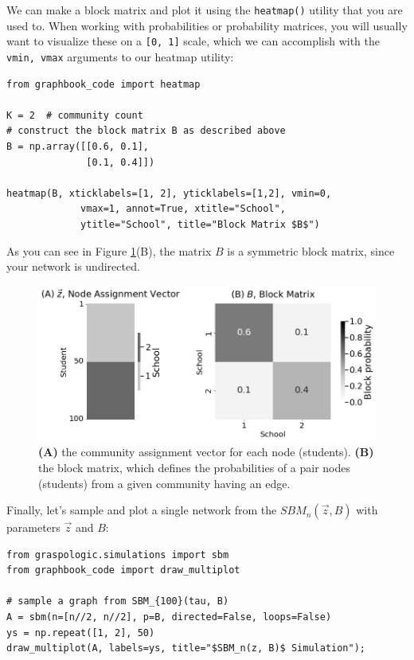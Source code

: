 We can make a block matrix and plot it using the \texttt{heatmap()} utility that you are used to. When working with probabilities or probability matrices, you will usually want to visualize these on a \texttt{[0, 1]} scale, which we can accomplish with the \texttt{vmin, vmax} arguments to our heatmap utility:

\begin{lstlisting}[style=python]
from graphbook_code import heatmap

K = 2  # community count
# construct the block matrix B as described above
B = np.array([[0.6, 0.1], 
              [0.1, 0.4]])

heatmap(B, xticklabels=[1, 2], yticklabels=[1,2], vmin=0, 
             vmax=1, annot=True, xtitle="School",
             ytitle="School", title="Block Matrix $B$")
\end{lstlisting}

As you can see in Figure \ref{fig:ch5:sbm}(B), the matrix $B$ is a symmetric block matrix, since your network is undirected. 

\begin{figure}
    \centering
    \includegraphics[width=\linewidth]{representations/ch5/Images/sbm.png}
    \caption[Parameters for a stochastic block model]{\textbf{(A)} the community assignment vector for each node (students). \textbf{(B)} the block matrix, which defines the probabilities of a pair nodes (students) from a given community having an edge.}
    \label{fig:ch5:sbm}
\end{figure}

Finally, let's sample and plot a single network from the $SBM_n(\vec z, B)$ with parameters $\vec z$ and $B$:

\begin{lstlisting}[style=python]
from graspologic.simulations import sbm
from graphbook_code import draw_multiplot

# sample a graph from SBM_{100}(tau, B)
A = sbm(n=[n//2, n//2], p=B, directed=False, loops=False)
ys = np.repeat([1, 2], 50)
draw_multiplot(A, labels=ys, title="$SBM_n(z, B)$ Simulation");
\end{lstlisting}

